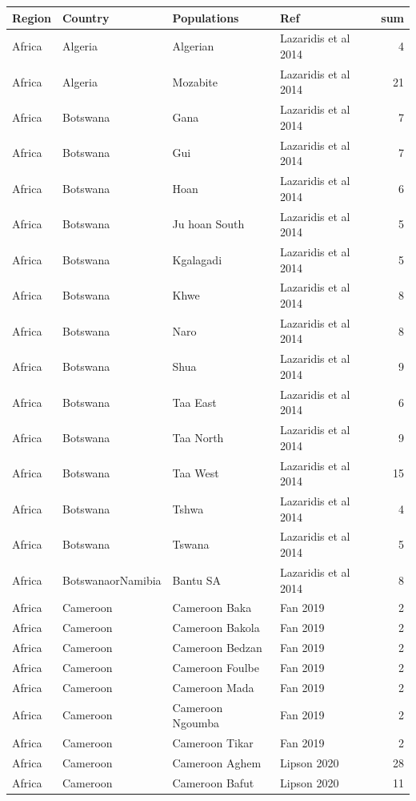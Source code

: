 \begingroup\fontsize{8}{10}\selectfont

\begin{longtable}[t]{lll>{\raggedright\arraybackslash}p{9em}r}
\toprule
Region & Country & Populations & Ref & sum\\
\midrule
Africa & Algeria & Algerian & Lazaridis et al 2014 & 4\\
Africa & Algeria & Mozabite & Lazaridis et al 2014 & 21\\
Africa & Botswana & Gana & Lazaridis et al 2014 & 7\\
Africa & Botswana & Gui & Lazaridis et al 2014 & 7\\
Africa & Botswana & Hoan & Lazaridis et al 2014 & 6\\
Africa & Botswana & Ju hoan South & Lazaridis et al 2014 & 5\\
Africa & Botswana & Kgalagadi & Lazaridis et al 2014 & 5\\
Africa & Botswana & Khwe & Lazaridis et al 2014 & 8\\
Africa & Botswana & Naro & Lazaridis et al 2014 & 8\\
Africa & Botswana & Shua & Lazaridis et al 2014 & 9\\
Africa & Botswana & Taa East & Lazaridis et al 2014 & 6\\
Africa & Botswana & Taa North & Lazaridis et al 2014 & 9\\
Africa & Botswana & Taa West & Lazaridis et al 2014 & 15\\
Africa & Botswana & Tshwa & Lazaridis et al 2014 & 4\\
Africa & Botswana & Tswana & Lazaridis et al 2014 & 5\\
Africa & BotswanaorNamibia & Bantu SA & Lazaridis et al 2014 & 8\\
Africa & Cameroon & Cameroon Baka & Fan 2019 & 2\\
Africa & Cameroon & Cameroon Bakola & Fan 2019 & 2\\
Africa & Cameroon & Cameroon Bedzan & Fan 2019 & 2\\
Africa & Cameroon & Cameroon Foulbe & Fan 2019 & 2\\
Africa & Cameroon & Cameroon Mada & Fan 2019 & 2\\
Africa & Cameroon & Cameroon Ngoumba & Fan 2019 & 2\\
Africa & Cameroon & Cameroon Tikar & Fan 2019 & 2\\
Africa & Cameroon & Cameroon Aghem & Lipson 2020 & 28\\
Africa & Cameroon & Cameroon Bafut & Lipson 2020 & 11\\

\end{longtable}
